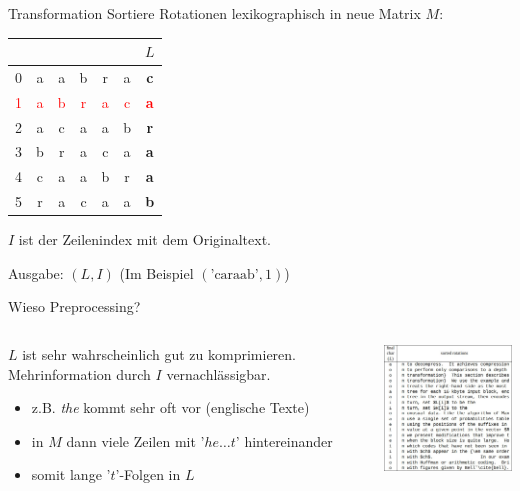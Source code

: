 \documentclass[ngerman,aspectratio=169,10pt]{beamer}
\newcommand{\red}[1]{\textcolor{red}{#1}}
\begin{document}
\begin{frame}{Transformation}
    Sortiere Rotationen lexikographisch in neue Matrix $M$:\\[20pt]
    
    \begin{tabular}{l|c c c c c c}
        &&&&&&$L$\\
        \hline
        0&a\vline&a&b&r&a&\textbf{c}\\
        \red{1}&\red{a}&\red{b}&\red{r}&\red{a}&\red{c}&\red{\textbf{a}}\vline\\
        2&a&c&a\vline&a&b&\textbf{r}\\
        3&b&r&a&c&a\vline&\textbf{a}\\
        4&c&a\vline&a&b&r&\textbf{a}\\
        5&r&a&c&a\vline&a&\textbf{b}\\
    \end{tabular}
    
    $I$ ist der Zeilenindex mit dem Originaltext.
    
    Ausgabe: $(L, I)$ (Im Beispiel $(\text{'caraab'}, 1)$)
\end{frame}

\begin{frame}{Wieso Preprocessing?}
	\begin{columns}
	    \begin{column}{0.46\textwidth}
	        $L$ ist sehr wahrscheinlich gut zu komprimieren. Mehrinformation durch $I$ vernachlässigbar.
	        \begin{itemize}
	            \item z.B. \textit{the} kommt sehr oft vor (englische Texte)
	            \item in $M$ dann viele Zeilen mit '$he\ldots t$' hintereinander
	            \item somit lange '$t$'-Folgen in $L$
	        \end{itemize}
	    \end{column}
	    \begin{column}{0.46\textwidth}
	        \includegraphics[width=200px]{graphics/table.jpg}
	    \end{column}
    \end{columns}
\end{frame}
\end{document}
